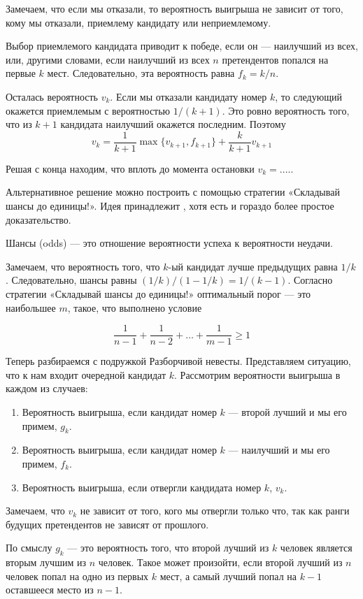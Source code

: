 \documentclass[nobib]{tufte-handout}
\theoremstyle{definition}
\newcounter{problem}
\newenvironment{problem}%
{%
\refstepcounter{problem}%
     \hypertarget{problem:{\theproblem}}{}
     \Writetofile{solution_file}{\protect\hypertarget{soln:\theproblem}{}}
     \begin{myenum}[label=\bfseries\protect\hyperlink{soln:\theproblem}{\theproblem},ref=\theproblem]
     \item%
    }%
    {%
    \end{myenum}}
\begin{document}
\begin{problem}
\begin{sol}
Замечаем, что если мы отказали, то вероятность выигрыша не зависит от того, кому мы отказали,
приемлему кандидату или неприемлемому.


Выбор приемлемого кандидата приводит к победе, если он — наилучший из всех, или,
другими словами, если наилучший из всех $n$ претендентов попался на первые $k$ мест.
Следовательно, эта вероятность равна $f_k = k/n$.

Осталась вероятность $v_k$. Если мы отказали кандидату номер $k$, то следующий
окажется приемлемым с вероятностью $1/(k+1)$. Это ровно вероятность того, что
из $k+1$ кандидата наилучший окажется последним. Поэтому
\[
v_k = \frac{1}{k+1} \max \{v_{k+1}, f_{k+1} \} + \frac{k}{k+1} v_{k+1}
\]

Решая с конца находим, что вплоть до момента остановки $v_k = ....$.


Альтернативное решение можно построить с помощью стратегии «Складывай шансы до единицы!».
Идея принадлежит \cite{bruss2000sum}, хотя есть и гораздо более простое доказательство.

Шансы (odds) — это отношение вероятности успеха к вероятности неудачи.

Замечаем, что вероятность того, что $k$-ый кандидат лучше предыдущих равна $1/k$.
Следовательно, шансы равны $(1/k)/(1-1/k)=1/(k-1)$. Согласно стратегии «Складывай шансы до единицы!»
оптимальный порог — это наибольшее $m$, такое, что выполнено условие

\[
\frac{1}{n-1} + \frac{1}{n-2} + \ldots + \frac{1}{m-1} \geq 1
\]


Теперь разбираемся с подружкой Разборчивой невесты. Представляем ситуацию, что к нам
входит очередной кандидат $k$. Рассмотрим вероятности выигрыша в каждом
из случаев:

\begin{enumerate}
  \item Вероятность выигрыша, если кандидат номер $k$ — второй лучший и мы его примем, $g_k$.
  \item Вероятность выигрыша, если кандидат номер $k$ — наилучший и мы его примем, $f_k$.
  \item Вероятность выигрыша, если отвергли кандидата номер $k$, $v_k$.
\end{enumerate}

Замечаем, что $v_k$ не зависит от того, кого мы отвергли только что, так как ранги
будущих претендентов не зависят от прошлого.

По смыслу $g_k$ — это вероятность того, что второй лучший из $k$ человек является вторым
лучшим из $n$ человек. Такое может произойти, если второй лучший из $n$ человек попал
на одно из первых $k$ мест, а самый лучший попал на $k-1$ оставшееся место из $n-1$.


\end{sol}
\end{problem}
\end{document}
